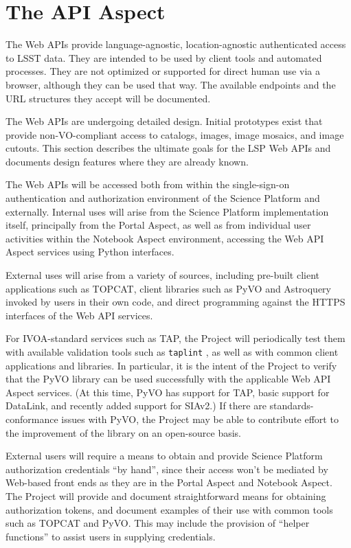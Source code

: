 \section{The API Aspect}\label{api-aspect}

The Web APIs provide language-agnostic, location-agnostic authenticated access
to LSST data.  They are intended to be used by client tools and automated
processes.  They are not optimized or supported for direct human use via a
browser, although they can be used that way.  The available endpoints and the
URL structures they accept will be documented.

The Web APIs are undergoing detailed design.  Initial prototypes exist that
provide non-VO-compliant access to catalogs, images, image mosaics, and image
cutouts.  This section describes the ultimate goals for the LSP Web APIs and
documents design features where they are already known.

The Web APIs will be accessed both from within the single-sign-on authentication
and authorization environment of the Science Platform and externally.
Internal uses will arise from the Science Platform implementation itself,
principally from the Portal Aspect, as well as from individual user activities
within the Notebook Aspect environment, accessing the Web API Aspect services
using Python interfaces.

External uses will arise from a variety of sources, including pre-built client
applications such as TOPCAT, client libraries such as PyVO and Astroquery
invoked by users in their own code, and direct programming against the
HTTPS interfaces of the Web API services.

For IVOA-standard services such as TAP, the Project will periodically test them
with available validation tools such as \texttt{taplint} \citep{TaplintLink,2006ASPC..351..666T}, 
as well as with common client applications and libraries.
In particular, it is the intent of the Project to verify that the PyVO library
can be used successfully with the applicable Web API Aspect services.
(At this time, PyVO has support for TAP, basic support for DataLink, and
recently added support for SIAv2.)
If there are standards-conformance issues with PyVO, the Project may be able
to contribute effort to the improvement of the library on an open-source basis.

External users will require a means to obtain and provide Science Platform
authorization credentials ``by hand'', since their access won't be mediated by
Web-based front ends as they are in the Portal Aspect and Notebook Aspect.
The Project will provide and document straightforward means for obtaining
authorization tokens, and document examples of their use with common tools
such as TOPCAT and PyVO.
This may include the provision of ``helper functions'' to assist users in
supplying credentials.

